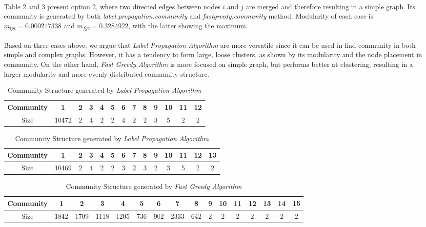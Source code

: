 \paragraph{}
Table \ref{table:2} and \ref{table:3} present option 2, where two directed edges between nodes $i$ and $j$ are merged and therefore resulting in a simple graph. Its community is generated by both \textit{label.propagation.community} and \textit{fastgreedy.community} method. Modularity of each case is $m_{lpc} =  0.000217338$ and $ m_{fgc} = 0.3284922$, with the latter showing the maximum.
\paragraph{}
Based on three cases above, we argue that \textit{Label Propagation Algorithm} are more versatile since it can be used in find community in both simple and complex graphs. However, it has a tendency to form large, loose clusters, as shown by its modularity and the node placement in community. On the other hand, \textit{Fast Greedy Algorithm} is more focused on simple graph, but performs better at clustering, resulting in a larger modularity and more evenly distributed community structure.

\begin{table}[h!]
	\centering
	\begin{tabular}{ |c|c|c|c|c|c|c|c|c|c|c|c|c| }
		\hline
		Community & 1 	  & 2 & 3 & 4 & 5 & 6 & 7 & 8 & 9 & 10 & 11 & 12  \\ 
		\hline
		Size      & 10472 & 2 & 4 & 2 & 2 & 4 & 2 & 2 & 3 & 5  & 2  & 2\\ 
		\hline
	\end{tabular}
	\caption{Community Structure generated by \textit{Label Propagation Algorithm}}
	\label{table:1}
\end{table}

\begin{table}[h!]
	\centering
	\begin{tabular}{ |c|c|c|c|c|c|c|c|c|c|c|c|c|c| }
		\hline
		Community & 1 	  & 2 & 3 & 4 & 5 & 6 & 7 & 8 & 9 & 10 & 11 & 12 & 13  \\ 
		\hline
		Size      & 10469 & 2 & 4 & 2 & 2 & 3 & 2 & 3 & 2 & 3  & 5  & 2  & 2\\ 
		\hline
	\end{tabular}
	\caption{Community Structure generated by \textit{Label Propagation Algorithm}}
	\label{table:2}
\end{table}

\begin{table}[h!]
	\centering
	\begin{tabular}{ |c|c|c|c|c|c|c|c|c|c|c|c|c|c|c|c| }
		\hline
		Community & 1 	 & 2    & 3    & 4    & 5   & 6   & 7    & 8   & 9 & 10 & 11 & 12 & 13 & 14 & 15  \\ 
		\hline
		Size      & 1842 & 1709 & 1118 & 1205 & 736 & 902 & 2333 & 642 & 2 & 2  & 2  & 2  & 2  & 2  & 2 \\ 
		\hline
	\end{tabular}
	\caption{Community Structure generated by \textit{Fast Greedy Algorithm}}
	\label{table:3}
\end{table}


